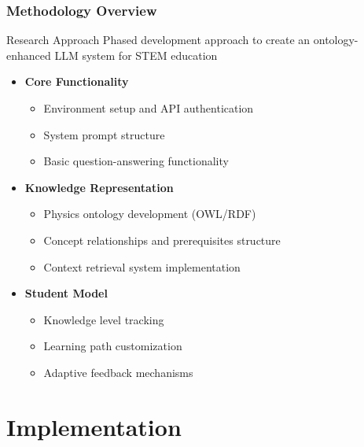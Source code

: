\documentclass{beamer}
\begin{document}
\begin{frame}
\frametitle{Methodology Overview}

\begin{block}{Research Approach}
Phased development approach to create an ontology-enhanced LLM system for STEM education
\end{block}

\begin{itemize}
    \item \textbf{Core Functionality}
    \begin{itemize}
        \item Environment setup and API authentication
        \item System prompt structure
        \item Basic question-answering functionality
    \end{itemize}
    
    \item \textbf{Knowledge Representation}
    \begin{itemize}
        \item Physics ontology development (OWL/RDF)
        \item Concept relationships and prerequisites structure
        \item Context retrieval system implementation
    \end{itemize}
    
    \item \textbf{Student Model}
    \begin{itemize}
        \item Knowledge level tracking
        \item Learning path customization
        \item Adaptive feedback mechanisms
    \end{itemize}
\end{itemize}
\end{frame}

\section{Implementation}
\end{document}
